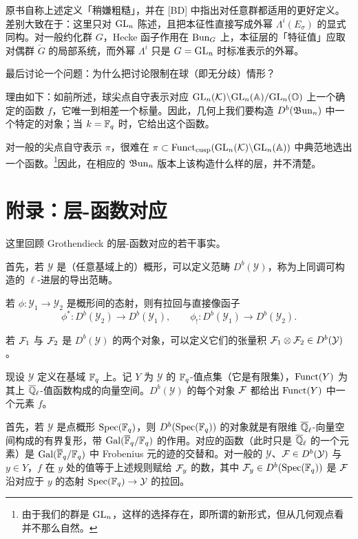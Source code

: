 \begin{annote}
原书自称上述定义「稍嫌粗糙」，并在 [BD] 中指出对任意群都适用的更好定义。差别大致在于：这里只对 $\mathrm{GL}_n$ 陈述，且把本征性直接写成外幂 $\Lambda^i(E_\sigma)$ 的显式同构。对一般约化群 $G$，Hecke 函子作用在 $\operatorname{Bun}_G$ 上，本征层的「特征值」应取对偶群 $\check{G}$ 的局部系统，而外幂 $\Lambda^i$ 只是 $G=\mathrm{GL}_n$ 时标准表示的外幂。\par\vspace{0.15em}{\raggedleft 【来源：原书 \S3.4 与 [BD]（A）】\par}
\end{annote}

最后讨论一个问题：为什么把讨论限制在球（即无分歧）情形？

理由如下：如前所述，球尖点自守表示对应 $\mathrm{GL}_n(\mathcal{K})\backslash\allowbreak\mathrm{GL}_n(\mathbb{A})/\mathrm{GL}_n(\mathbb{O})$ 上一个确定的函数 $f$，它唯一到相差一个标量。因此，几何上我们要构造 $D^b(\mathfrak{B}\mathrm{un}_n)$ 中一个特定的对象；当 $k=\mathbb{F}_q$ 时，它给出这个函数。

对一般的尖点自守表示 $\pi$，很难在 $\pi\subset\operatorname{Funct}_{\mathrm{cusp}}(\mathrm{GL}_n(\mathcal{K})\backslash\allowbreak\mathrm{GL}_n(\mathbb{A}))$ 中典范地选出一个函数。\footnote{由于我们的群是 $\mathrm{GL}_n$，这样的选择存在，即所谓的新形式，但从几何观点看并不那么自然。}因此，在相应的 $\mathfrak{B}\mathrm{un}_n$ 版本上该构造什么样的层，并不清楚。

\section{附录：层-函数对应}

这里回顾 Grothendieck 的层-函数对应的若干事实。

首先，若 $\mathcal{Y}$ 是（任意基域上的）概形，可以定义范畴 $D^b(\mathcal{Y})$，称为上同调可构造的 $\ell$-进层的导出范畴。

若 $\phi:\mathcal{Y}_1\to\mathcal{Y}_2$ 是概形间的态射，则有拉回与直接像函子
\[
\phi^*:D^b(\mathcal{Y}_2)\to D^b(\mathcal{Y}_1),\qquad
\phi_!:D^b(\mathcal{Y}_1)\to D^b(\mathcal{Y}_2).
\]

若 $\mathcal{F}_1$ 与 $\mathcal{F}_2$ 是 $D^b(\mathcal{Y})$ 的两个对象，可以定义它们的张量积 $\mathcal{F}_1\otimes\mathcal{F}_2\in D^b(\mathcal{Y})$。

现设 $\mathcal{Y}$ 定义在基域 $\mathbb{F}_q$ 上。记 $Y$ 为 $\mathcal{Y}$ 的 $\mathbb{F}_q$-值点集（它是有限集），$\operatorname{Funct}(Y)$ 为其上 $\overline{\mathbb{Q}}_\ell$-值函数构成的向量空间。$D^b(\mathcal{Y})$ 的每个对象 $\mathcal{F}$ 都给出 $\operatorname{Funct}(Y)$ 中一个元素 $f$。

首先，若 $\mathcal{Y}$ 是点概形 $\operatorname{Spec}(\mathbb{F}_q)$，则 $D^b(\operatorname{Spec}(\mathbb{F}_q))$ 的对象就是有限维 $\overline{\mathbb{Q}}_\ell$-向量空间构成的有界复形，带 $\mathrm{Gal}(\overline{\mathbb{F}}_q/\mathbb{F}_q)$ 的作用。对应的函数（此时只是 $\overline{\mathbb{Q}}_\ell$ 的一个元素）是 $\mathrm{Gal}(\overline{\mathbb{F}}_q/\mathbb{F}_q)$ 中 Frobenius 元的迹的交替和。对一般的 $\mathcal{Y}$、$\mathcal{F}\in D^b(\mathcal{Y})$ 与 $y\in Y$，$f$ 在 $y$ 处的值等于上述规则赋给 $\mathcal{F}_y$ 的数，其中 $\mathcal{F}_y\in D^b(\operatorname{Spec}(\mathbb{F}_q))$ 是 $\mathcal{F}$ 沿对应于 $y$ 的态射 $\operatorname{Spec}(\mathbb{F}_q)\to\mathcal{Y}$ 的拉回。

